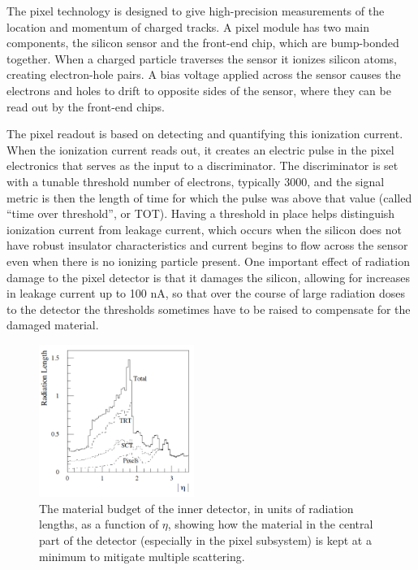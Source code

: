 The pixel technology is designed to give high-precision measurements of the location and momentum of charged tracks.  
A pixel module has two main components, the silicon sensor and the front-end chip, which are 
bump-bonded together.  When a charged particle traverses the sensor it ionizes silicon atoms, creating 
electron-hole pairs. A bias voltage applied across the sensor causes the electrons and holes 
to drift to opposite sides of the sensor, where they can be read out by the front-end chips.  

The pixel readout is based on detecting and quantifying this ionization current.  When the ionization
current reads out, it creates an electric pulse in the pixel electronics that serves as the input
to a discriminator.  
The discriminator is set with a tunable threshold number of electrons, typically 3000, and 
the signal metric is then the length of time for which the pulse was above that value (called ``time 
over threshold'', or TOT).  Having a threshold in place helps distinguish ionization current from leakage current, 
which occurs when the silicon does not have robust insulator characteristics and current begins to flow across the sensor even 
when there is no ionizing particle present.  One important effect of radiation damage to the pixel detector is that 
it damages the silicon, allowing for increases in leakage current up to 100 nA, so that over the course 
of large radiation doses to the detector the thresholds sometimes have to be raised to compensate for the damaged material.  


\begin{figure}
  \begin{center}
	\includegraphics[width=0.45\textwidth]{ATLASDetector/images/id_material_budget.pdf}
    \caption{The material budget of the inner detector, in units of radiation
    lengths, as a function of $\eta$, showing how the material in the central part of
    the detector (especially in the pixel subsystem) is kept at a minimum to mitigate
    multiple scattering.  \label{fig:id_material}}
	\end{center}
\end{figure}

